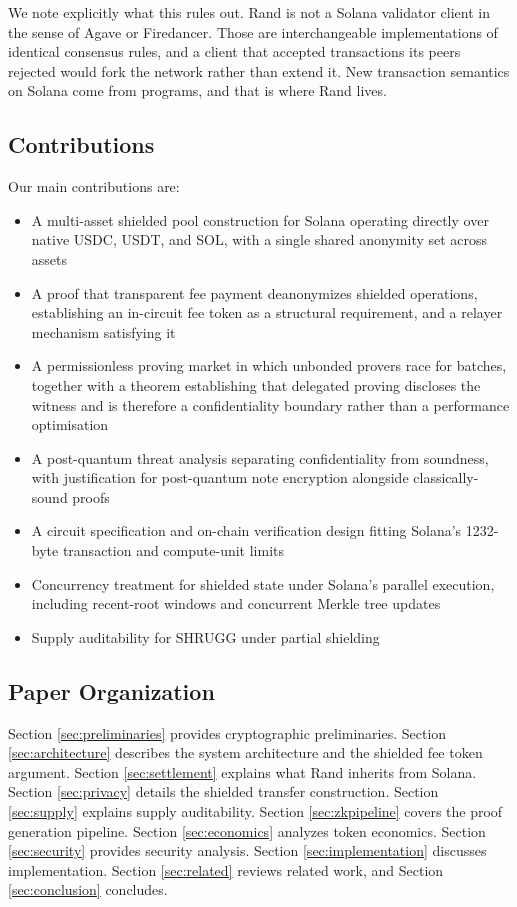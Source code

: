 \documentclass[11pt,a4paper]{article}
\begin{document}
We note explicitly what this rules out. Rand is not a Solana validator client in the sense of Agave or Firedancer. Those are interchangeable implementations of identical consensus rules, and a client that accepted transactions its peers rejected would fork the network rather than extend it. New transaction semantics on Solana come from programs, and that is where Rand lives.

\subsection{Contributions}

Our main contributions are:

\begin{itemize}
    \item A multi-asset shielded pool construction for Solana operating directly over native USDC, USDT, and SOL, with a single shared anonymity set across assets
    \item A proof that transparent fee payment deanonymizes shielded operations, establishing an in-circuit fee token as a structural requirement, and a relayer mechanism satisfying it
    \item A permissionless proving market in which unbonded provers race for batches, together with a theorem establishing that delegated proving discloses the witness and is therefore a confidentiality boundary rather than a performance optimisation
    \item A post-quantum threat analysis separating confidentiality from soundness, with justification for post-quantum note encryption alongside classically-sound proofs
    \item A circuit specification and on-chain verification design fitting Solana's 1232-byte transaction and compute-unit limits
    \item Concurrency treatment for shielded state under Solana's parallel execution, including recent-root windows and concurrent Merkle tree updates
    \item Supply auditability for SHRUGG under partial shielding
\end{itemize}

\subsection{Paper Organization}

Section \ref{sec:preliminaries} provides cryptographic preliminaries. Section \ref{sec:architecture} describes the system architecture and the shielded fee token argument. Section \ref{sec:settlement} explains what Rand inherits from Solana. Section \ref{sec:privacy} details the shielded transfer construction. Section \ref{sec:supply} explains supply auditability. Section \ref{sec:zkpipeline} covers the proof generation pipeline. Section \ref{sec:economics} analyzes token economics. Section \ref{sec:security} provides security analysis. Section \ref{sec:implementation} discusses implementation. Section \ref{sec:related} reviews related work, and Section \ref{sec:conclusion} concludes.
\end{document}
